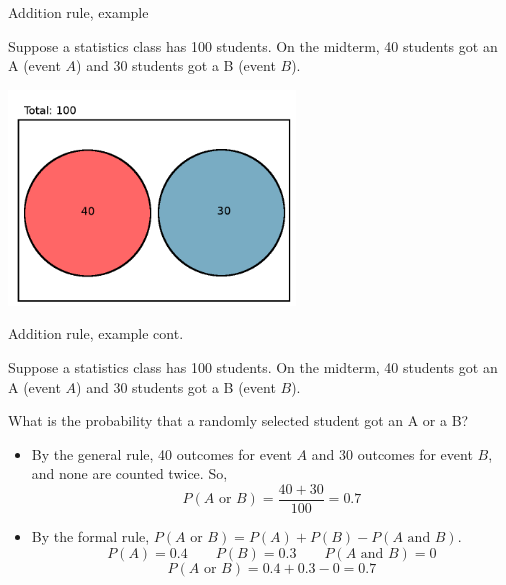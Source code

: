 \documentclass[xcolor=table, handout]{beamer}
\begin{document}
\begin{frame}{Addition rule, example}
\begin{block}{}
Suppose a statistics class has 100 students. On the midterm, 40 students got an A (event $A$) and 30 students got a B (event $B$).
\end{block}

{\centering
\includegraphics[width=3in]{../images/ch4_venn_dsj_ex}\par
}
\end{frame}

\begin{frame}{Addition rule, example cont.}
\begin{block}{}
Suppose a statistics class has 100 students. On the midterm, 40 students got an A (event $A$) and 30 students got a B (event $B$).
\end{block}

\begin{exampleblock}{}
What is the probability that a randomly selected student got an A or a B?
\begin{itemize}
\pause
\item By the general rule, 40 outcomes for event $A$ and 30 outcomes for event $B$, and none are counted twice. So,
\[P(A \text{ or } B) = \frac {40 + 30}{100} = 0.7\]
\pause
\item By the formal rule, $P(A \text{ or } B) = P(A) + P(B) - P(A \text{ and } B)$.
\[P(A) = 0.4 \qquad P(B) = 0.3 \qquad P(A \text{ and } B) = 0\]
\[P(A \text{ or } B) = 0.4 + 0.3 - 0 = 0.7\]

\end{itemize}
\end{exampleblock}
\end{frame}
\end{document}
